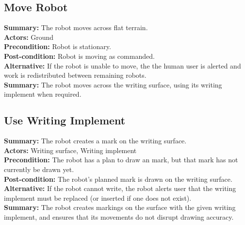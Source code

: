 \subsection{Move Robot}
\textbf{Summary:} The robot moves across flat terrain. \\
\textbf{Actors:} Ground \\
\textbf{Precondition:} Robot is stationary. \\
\textbf{Post-condition:} Robot is moving as commanded. \\
\textbf{Alternative:} If the robot is unable to move, the the human user is alerted and work is redistributed between remaining robots. \\
\textbf{Summary:} The robot moves across the writing surface, using its writing implement when required. \\

\subsection{Use Writing Implement}
\textbf{Summary:} The robot creates a mark on the writing surface. \\
\textbf{Actors:} Writing surface, Writing implement \\
\textbf{Precondition:} The robot has a plan to draw an mark, but that mark has not currently be drawn yet. \\
\textbf{Post-condition:} The robot's planned mark is drawn on the writing surface. \\
\textbf{Alternative:} If the robot cannot write, the robot alerts user that the writing implement must be replaced (or inserted if one does not exist). \\
\textbf{Summary:} The robot creates markings on the surface with the given writing implement, and ensures that its movements do not disrupt drawing accuracy. \\



